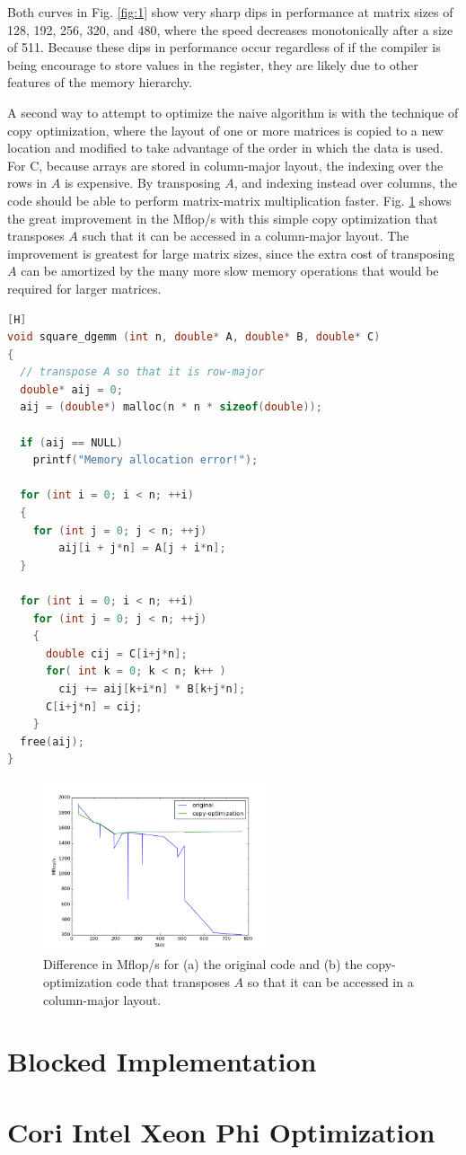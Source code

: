 \documentclass[10pt]{article}
\begin{document}
Both curves in Fig. \ref{fig:1} show very sharp dips in performance at matrix sizes of 128, 192, 256, 320, and 480, where the speed decreases monotonically after a size of 511. Because these dips in performance occur regardless of if the compiler is being encourage to store values in the register, they are likely due to other features of the memory hierarchy. 

A second way to attempt to optimize the naive algorithm is with the technique of copy optimization, where the layout of one or more matrices is copied to a new location and modified to take advantage of the order in which the data is used. For C, because arrays are stored in column-major layout, the indexing over the rows in \(A\) is expensive. By transposing \(A\), and indexing instead over columns, the code should be able to perform matrix-matrix multiplication faster. Fig. \ref{fig:2} shows the great improvement in the Mflop/s with this simple copy optimization that transposes \(A\) such that it can be accessed in a column-major layout. The improvement is greatest for large matrix sizes, since the extra cost of transposing \(A\) can be amortized by the many more slow memory operations that would be required for larger matrices.

\begin{lstlisting}[language=C][H]
void square_dgemm (int n, double* A, double* B, double* C)
{
  // transpose A so that it is row-major
  double* aij = 0;
  aij = (double*) malloc(n * n * sizeof(double));

  if (aij == NULL)
    printf("Memory allocation error!");

  for (int i = 0; i < n; ++i)
  {
    for (int j = 0; j < n; ++j)
        aij[i + j*n] = A[j + i*n];
  }

  for (int i = 0; i < n; ++i)
    for (int j = 0; j < n; ++j)
    {
      double cij = C[i+j*n];
      for( int k = 0; k < n; k++ )
        cij += aij[k+i*n] * B[k+j*n];
      C[i+j*n] = cij;
    }
  free(aij);
}
\end{lstlisting}

\begin{figure}[H]
\centering
\includegraphics[width=0.6\textwidth]{figures/copy-optimization.png}
\caption{Difference in Mflop/s for (a) the original code and (b) the copy-optimization code that transposes \(A\) so that it can be accessed in a column-major layout.}
\label{fig:2}
\end{figure}

\section{Blocked Implementation}

\section{Cori Intel Xeon Phi Optimization}
\end{document}
